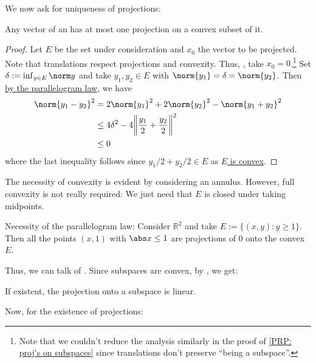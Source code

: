 	We now ask for uniqueness of projections:
	
	\begin{prp}
		Any vector of an \IPS has at most one projection on a convex subset of it.
	\end{prp}
	
	\begin{proof}
		Let $E$ be the set under consideration and $x_0$ the vector to be projected. Note that translations respect projections and convexity. Thus, \wlogg, take $x_0 = 0$.\footnote{Note that we couldn't reduce the analysis similarly in the proof of \ref{PRP: proj's on subspaces} since translations don't preserve ``being a subspace''.}
		Set $\delta := \inf_{y\in E} \norm y$ and take $y_1, y_2\in E$ with $\norm{y_1} = \delta = \norm{y_2}$. Then \uline{by the parallelogram law},
		we have
		\begin{align*}
			\norm{y_1 - y_2}^2 & = 2\norm{y_1}^2 + 2\norm{y_2}^2 - \norm{y_1 + y_2}^2\\
			& \le 4\delta^2 - 4\biggl\| \frac{y_1}{2} + \frac{y_2}{2} \biggr\|^2\\
			& \le 0
		\end{align*}
		where the last inequality follows since $y_1/2 + y_2/2\in E$ as \uline{$E$ is convex}.
	\end{proof}
	
	\begin{rmk}
		\begin{rmklist}
			\item The necessity of convexity is evident by considering an annulus. However, full convexity is not really required: We just need that $E$ is closed under taking midpoints.
			
			\item Necessity of the parallelogram law: Consider $\mathbb R^2$ and take $E := \{(x, y) : y\ge 1\}$. Then all the points $(x, 1)$ with $\abs x\le 1$ are projections of $0$ onto the convex $E$.
		\end{rmklist}
	\end{rmk}
	
	Thus, we can talk of . Since subspaces are convex, by , we get:
	
	\begin{cor}
		If existent, the projection onto a subspace is linear.
	\end{cor}
	
	Now, for the existence of projections:
	
